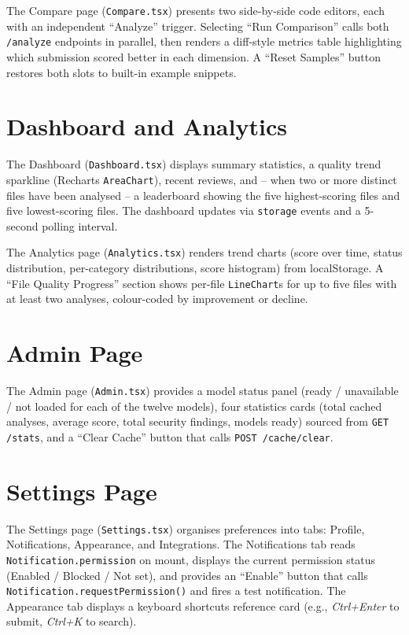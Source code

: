 \documentclass[12pt, oneside]{report}
\begin{document}
The Compare page (\texttt{Compare.tsx}) presents two side-by-side code editors, each
with an independent ``Analyze'' trigger. Selecting ``Run Comparison'' calls both
\texttt{/analyze} endpoints in parallel, then renders a diff-style metrics table
highlighting which submission scored better in each dimension. A ``Reset Samples''
button restores both slots to built-in example snippets.

\section{Dashboard and Analytics}

The Dashboard (\texttt{Dashboard.tsx}) displays summary statistics, a quality trend
sparkline (Recharts \texttt{AreaChart}), recent reviews, and -- when two or more
distinct files have been analysed -- a leaderboard showing the five highest-scoring
files and five lowest-scoring files. The dashboard updates via \texttt{storage}
events and a 5-second polling interval.

The Analytics page (\texttt{Analytics.tsx}) renders trend charts (score over time,
status distribution, per-category distributions, score histogram) from localStorage.
A ``File Quality Progress'' section shows per-file \texttt{LineChart}s for up to five
files with at least two analyses, colour-coded by improvement or decline.

\section{Admin Page}

The Admin page (\texttt{Admin.tsx}) provides a model status panel (ready / unavailable /
not loaded for each of the twelve models), four statistics cards (total cached analyses,
average score, total security findings, models ready) sourced from \texttt{GET /stats},
and a ``Clear Cache'' button that calls \texttt{POST /cache/clear}.

\section{Settings Page}

The Settings page (\texttt{Settings.tsx}) organises preferences into tabs: Profile,
Notifications, Appearance, and Integrations. The Notifications tab reads
\texttt{Notification.permission} on mount, displays the current permission status
(Enabled / Blocked / Not set), and provides an ``Enable'' button that calls
\texttt{Notification.requestPermission()} and fires a test notification. The
Appearance tab displays a keyboard shortcuts reference card (e.g., \textit{Ctrl+Enter}
to submit, \textit{Ctrl+K} to search).
\end{document}
